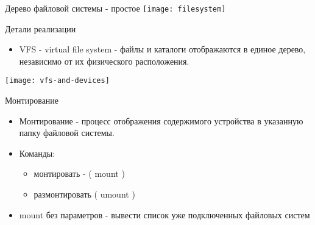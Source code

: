 \begin{frame}{Дерево файловой системы - простое}
\texttt{[image: filesystem]} 
\end{frame}

\begin{frame}{Детали реализации}
  \begin{itemize}
    \item \alert{VFS - virtual file system} - файлы и каталоги отображаются в единое дерево, независимо от их физического расположения.
  \end{itemize}
  \texttt{[image: vfs-and-devices]}
\end{frame}

\begin{frame}{Монтирование}
  \begin{itemize}
    \item \alert{Монтирование} - процесс отображения содержимого устройства в указанную папку файловой системы.
    \item Команды:
      \begin{itemize}
        \item монтировать - ( \alert{mount} ) 
        \item размонтировать ( \alert{umount} )
      \end{itemize}
    \item \alert{mount} без параметров - вывести список уже подключенных файловых систем
  \end{itemize}
  
\end{frame}

